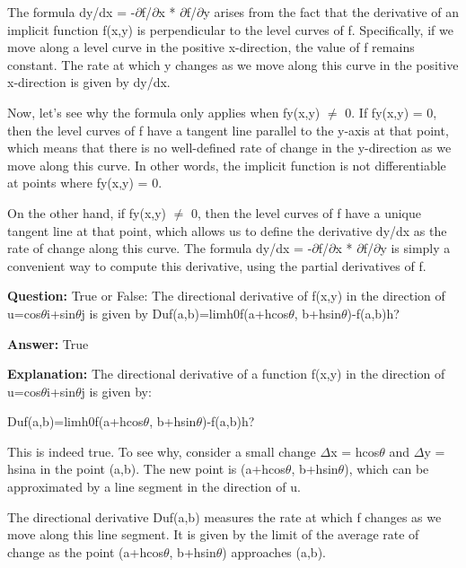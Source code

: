 \documentclass{article}
\begin{document}
The formula dy/dx = -\ensuremath{\partial}f/\ensuremath{\partial}x * \ensuremath{\partial}f/\ensuremath{\partial}y arises from the fact that the derivative of an implicit function f(x,y) is perpendicular to the level curves of f. Specifically, if we move along a level curve in the positive x-direction, the value of f remains constant. The rate at which y changes as we move along this curve in the positive x-direction is given by dy/dx.

Now, let's see why the formula only applies when fy(x,y) \ensuremath{\neq} 0. If fy(x,y) = 0, then the level curves of f have a tangent line parallel to the y-axis at that point, which means that there is no well-defined rate of change in the y-direction as we move along this curve. In other words, the implicit function is not differentiable at points where fy(x,y) = 0.

On the other hand, if fy(x,y) \ensuremath{\neq} 0, then the level curves of f have a unique tangent line at that point, which allows us to define the derivative dy/dx as the rate of change along this curve. The formula dy/dx = -\ensuremath{\partial}f/\ensuremath{\partial}x * \ensuremath{\partial}f/\ensuremath{\partial}y is simply a convenient way to compute this derivative, using the partial derivatives of f.
                
                \vspace{0.5cm} 
        
            
                \textbf {Question:} True or False: The directional derivative of f(x,y) in the direction of u=cos\ensuremath{\theta}i+sin\ensuremath{\theta}j is given by Duf(a,b)=limh{\textrightarrow}0f(a+hcos\ensuremath{\theta}, b+hsin\ensuremath{\theta})-f(a,b)h?
                
                \textbf{Answer:} True

                \textbf{Explanation:} The directional derivative of a function f(x,y) in the direction of u=cos\ensuremath{\theta}i+sin\ensuremath{\theta}j is given by:

Duf(a,b)=limh{\textrightarrow}0f(a+hcos\ensuremath{\theta}, b+hsin\ensuremath{\theta})-f(a,b)h?

This is indeed true. To see why, consider a small change \ensuremath{\Delta}x = hcos\ensuremath{\theta} and \ensuremath{\Delta}y = hsina in the point (a,b). The new point is (a+hcos\ensuremath{\theta}, b+hsin\ensuremath{\theta}), which can be approximated by a line segment in the direction of u.

The directional derivative Duf(a,b) measures the rate at which f changes as we move along this line segment. It is given by the limit of the average rate of change as the point (a+hcos\ensuremath{\theta}, b+hsin\ensuremath{\theta}) approaches (a,b).
\end{document}
